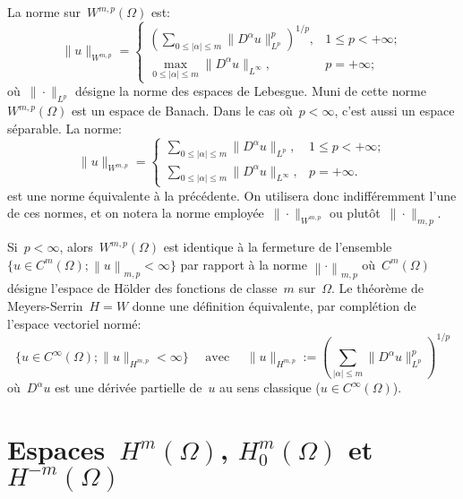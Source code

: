 \medskip
La norme sur~$W^{m,p}(\Omega)$ est:
\begin{equation}
\| u \|_{W^{m, p}} = \begin{cases} \left( \sum \limits_{0\leqslant | \alpha | \leqslant m} \| D^{\alpha} u \|_{L^{p}}^{p} \right)^{1/p}, & 1 \leqslant p < + \infty; \\ \max\limits _{0\leqslant | \alpha | \leqslant m} \| D^{\alpha} u \|_{L^{\infty}}, & p = + \infty; \end{cases}
\end{equation}
où~$\|\cdot\|_{L^{p}}$ désigne la norme des espaces de Lebesgue.
Muni de cette norme~$W^{m,p}(\Omega)$ est un espace de Banach.
Dans le cas où~$p<\infty$, c'est aussi un espace séparable.
\medskipvm
La norme:
\begin{equation}
\| u \|_{W^{m, p}} = 
   \begin{cases} 
   \sum\limits _{0\leqslant | \alpha | \leqslant m} \| D^{\alpha} u \|_{L^{p}}, & 1 \leqslant p < + \infty; \\ \sum\limits _{0 \leqslant | \alpha | \leqslant m} \| D^{\alpha} u \|_{L^{\infty}}, & p = + \infty. 
   \end{cases}
\end{equation}
est une norme équivalente à la précédente. On utilisera donc indifféremment l'une de ces normes, et on notera la norme employée~$\|\cdot\|_{W^{m, p}}$ ou plutôt~$\|\cdot\|_{m, p}$.

\medskip{}
Si~$p<\infty$, alors~$W^{m,p}(\Omega)$ est identique à la fermeture de l'ensemble $\lbrace u \in C^m(\Omega) ; \left\|u \right\|_{m,p} < \infty \rbrace$ par rapport à la norme $\left\|\cdot\right\|_{m,p}$ où~$C^m(\Omega)$ désigne l'espace de Hölder des fonctions de
classe~$m$ sur~$\Omega$.
\medskipvm
Le théorème de Meyers-Serrin~$H=W$ donne une définition équivalente, par complétion de l'espace vectoriel normé:
\begin{equation}
\{u\in C^\infty(\Omega);\| u \|_{H^{m, p}} < \infty\}\quad\text{ avec }\quad
\| u \|_{H^{m, p}}:= \left( \sum_{| \alpha | \leqslant m} \| D^{\alpha} u \|_{L^{p}}^p \right)^{1/p}
\end{equation}
où~$D^\alpha u$ est une dérivée partielle de~$u$ au sens classique ($u \in C^\infty(\Omega)$).


\medskip
\section{Espaces~$H^m(\Omega)$, $H^m_0(\Omega)$ et~$H^{-m}(\Omega)$}

